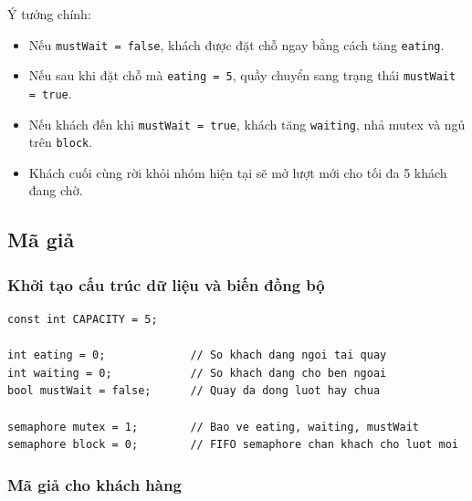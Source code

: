 Ý tưởng chính:

\begin{itemize}
    \item Nếu \texttt{mustWait = false}, khách được đặt chỗ ngay bằng cách tăng
    \texttt{eating}.
    \item Nếu sau khi đặt chỗ mà \texttt{eating = 5}, quầy chuyển sang trạng
    thái \texttt{mustWait = true}.
    \item Nếu khách đến khi \texttt{mustWait = true}, khách tăng
    \texttt{waiting}, nhả mutex và ngủ trên \texttt{block}.
    \item Khách cuối cùng rời khỏi nhóm hiện tại sẽ mở lượt mới cho tối đa
    5 khách đang chờ.
\end{itemize}

\subsection{Mã giả}

\subsubsection*{Khởi tạo cấu trúc dữ liệu và biến đồng bộ}

\begin{lstlisting}
const int CAPACITY = 5;

int eating = 0;             // So khach dang ngoi tai quay
int waiting = 0;            // So khach dang cho ben ngoai
bool mustWait = false;      // Quay da dong luot hay chua

semaphore mutex = 1;        // Bao ve eating, waiting, mustWait
semaphore block = 0;        // FIFO semaphore chan khach cho luot moi
\end{lstlisting}

\subsubsection*{Mã giả cho khách hàng}

